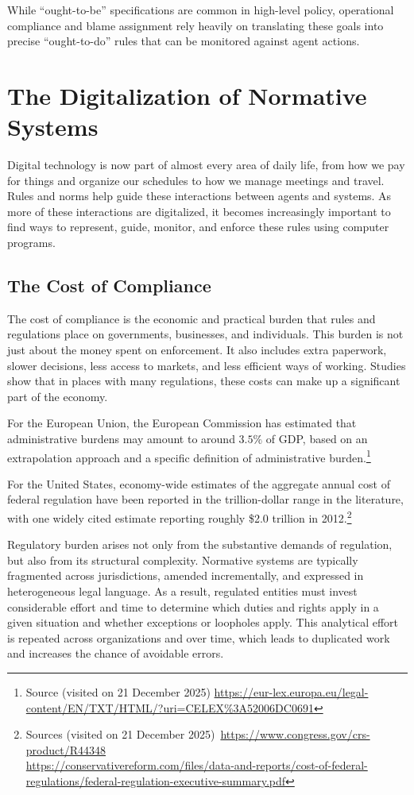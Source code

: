 While ``ought-to-be'' specifications are common in high-level policy, operational compliance and blame assignment rely heavily on translating these goals into precise ``ought-to-do'' rules that can be monitored against agent actions.

\section{The Digitalization of Normative Systems}

Digital technology is now part of almost every area of daily life, from how we pay for things and organize our schedules to how we manage meetings and travel.
Rules and norms help guide these interactions between agents and systems. As more of these interactions are digitalized, it becomes increasingly important to find ways to represent, guide, monitor, and enforce these rules using computer programs.

\subsection{The Cost of Compliance}
The cost of compliance is the economic and practical burden that rules and regulations place on governments, businesses, and individuals. This burden is not just about the money spent on enforcement. It also includes extra paperwork, slower decisions, less access to markets, and less efficient ways of working. Studies show that in places with many regulations, these costs can make up a significant part of the economy.

For the European Union, the European Commission has estimated that administrative burdens may amount to around $3.5\%$ of GDP, based on an extrapolation approach and a specific definition of administrative burden.\footnote{Source (visited on 21 December 2025) \url{https://eur-lex.europa.eu/legal-content/EN/TXT/HTML/?uri=CELEX\%3A52006DC0691}}

For the United States, economy-wide estimates of the aggregate annual cost of federal regulation have been reported in the trillion-dollar range in the literature, with one widely cited estimate reporting roughly \$2.0 trillion in 2012.\footnote{Sources (visited on 21 December 2025)~\url{https://www.congress.gov/crs-product/R44348} \; \\  \url{https://conservativereform.com/files/data-and-reports/cost-of-federal-regulations/federal-regulation-executive-summary.pdf}}

Regulatory burden arises not only from the substantive demands of regulation, but also from its structural complexity. Normative systems are typically fragmented across jurisdictions, amended incrementally, and expressed in heterogeneous legal language. As a result, regulated entities must invest considerable effort and time to determine which duties and rights apply in a given situation and whether exceptions or loopholes apply. This analytical effort is repeated across organizations and over time, which leads to duplicated work and increases the chance of avoidable errors.

